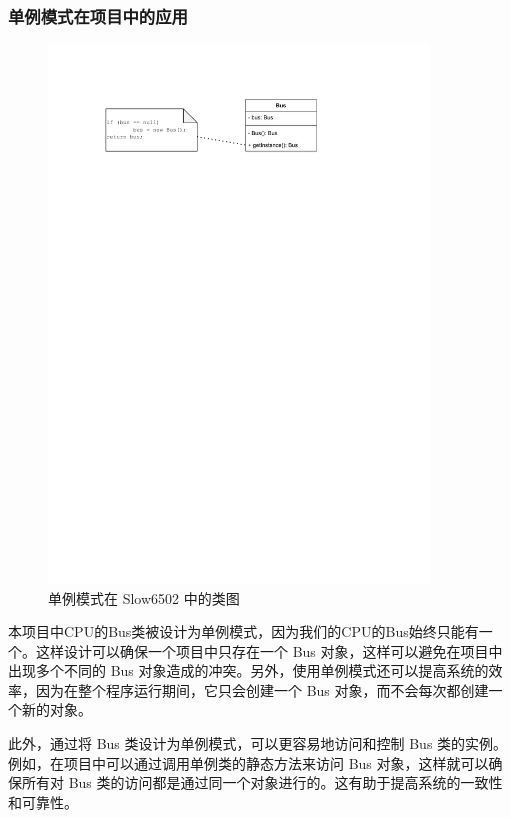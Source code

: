\documentclass[cn,black,12pt,normal]{elegantnote}
\begin{document}
\subsubsection{单例模式在项目中的应用}

\begin{figure}[H]
  \centering
  \includegraphics[width=0.9\textwidth]{figures/单例.pdf}
  \caption{单例模式在 Slow6502 中的类图}
\end{figure}

本项目中CPU的Bus类被设计为单例模式，因为我们的CPU的Bus始终只能有一个。这样设计可以确保一个项目中只存在一个 Bus 对象，这样可以避免在项目中出现多个不同的 Bus 对象造成的冲突。另外，使用单例模式还可以提高系统的效率，因为在整个程序运行期间，它只会创建一个 Bus 对象，而不会每次都创建一个新的对象。

此外，通过将 Bus 类设计为单例模式，可以更容易地访问和控制 Bus 类的实例。例如，在项目中可以通过调用单例类的静态方法来访问 Bus 对象，这样就可以确保所有对 Bus 类的访问都是通过同一个对象进行的。这有助于提高系统的一致性和可靠性。
\end{document}
